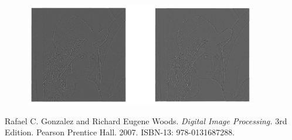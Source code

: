 \documentclass{article}
\begin{document}
 \begin{figure}[H]
    \includegraphics[width=0.9\textwidth]{figura4.png}
\end{figure}

\begin{thebibliography}{9}
Rafael C. Gonzalez and Richard Eugene Woods. \textit{Digital Image Processing.} 3rd Edition. Pearson Prentice Hall. 2007. ISBN-13: 978-0131687288.
\end{thebibliography}
\end{document}
